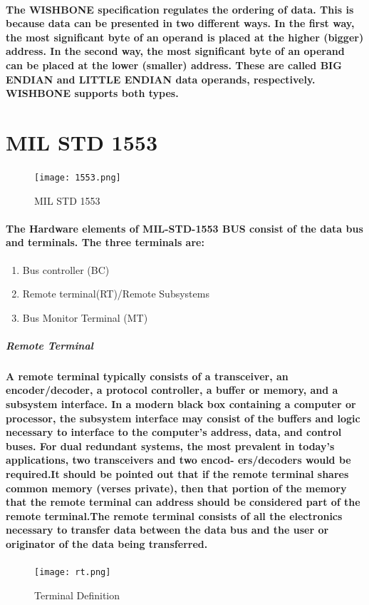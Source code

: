 \documentclass[12pt,a4paper]{report}
\begin{document}
\paragraph{\textrm{\textmd {The WISHBONE specification regulates the ordering of data. This is because data can be presented in two different ways. In the first way, the most significant byte of an operand is placed
			at the higher (bigger) address. In the second way, the most significant byte of an operand can be
			placed at the lower (smaller) address. These are called BIG ENDIAN and LITTLE ENDIAN
			data operands, respectively. WISHBONE supports both types.  }}}
\section{MIL STD 1553}
\begin{figure}[h]
	\centering
	\texttt{[image: 1553.png]}
	\caption{MIL STD 1553}
	\label{fig:1553}
\end{figure}
\paragraph{\textrm{\textmd{The Hardware elements of	MIL-STD-1553 BUS consist of the data bus and terminals. The three terminals are:}}}
\begin{enumerate}
	\item Bus controller (BC)
	\item Remote terminal(RT)/Remote Subsystems
	\item Bus Monitor Terminal (MT)
\end{enumerate} 
\subparagraph{Remote Terminal}
\paragraph{\textrm{\textmd{A remote terminal typically consists of a transceiver, an encoder/decoder,
			a protocol controller, a buffer or memory, and a subsystem interface. In a
			modern black box containing a computer or processor, the subsystem
			interface may consist of the buffers and logic necessary to interface to the
			computer's address, data, and control buses. For dual redundant systems,
			the most prevalent in today's applications, two transceivers and two encod-
			ers/decoders would be required.It should be pointed out that if
			the remote terminal shares common memory (verses private), then that
			portion of the memory that the remote terminal can address should be
			considered part of the remote terminal.The
			remote terminal consists of all the electronics necessary to transfer data between the data bus and the user or originator of the data being
			transferred.}}}
\begin{figure}[h]
	\centering
	\texttt{[image: rt.png]}
	\caption{Terminal Definition}
	\label{fig:rt}
\end{figure}
\end{document}
